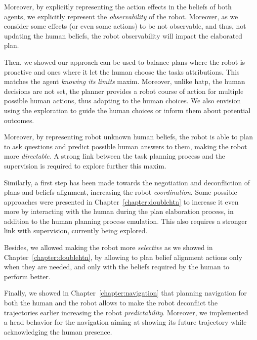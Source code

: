 \documentclass[a4paper,11pt,twoside]{StyleThese}
\begin{document}
Moreover, by explicitly representing the action effects in the beliefs of both agents, we explicitly represent the \textit{observability} of the robot. Moreover, as we consider some effects (or even some actions) to be not observable, and thus, not updating the human beliefs, the robot observability will impact the elaborated plan.

Then, we showed our approach can be used to balance plans where the robot is proactive and ones where it let the human choose the tasks attributions. This matches the agent \textit{knowing its limits} maxim. Moreover, unlike \acrshort{hatp}, the human decisions are not set, the planner provides a robot course of action for multiple possible human actions, thus adapting to the human choices. We also envision using the  exploration to guide the human choices or inform them about potential outcomes.

Moreover, by representing robot unknown human beliefs, the robot is able to plan to ask questions and predict possible human answers to them, making the robot more \textit{directable}. A strong link between the task planning process and the supervision is required to explore further this maxim.

Similarly, a first step has been made towards the negotiation and deconfliction of plans and beliefs alignment, increasing the robot \textit{coordination}. Some possible approaches were presented in Chapter~\ref{chapter:doublehtn} to increase it even more by interacting with the human during the plan elaboration process, in addition to the human planning process emulation. This also requires a stronger link with supervision, currently being explored.

Besides, we allowed making the robot more \textit{selective} as we showed in Chapter~\ref{chapter:doublehtn}, by allowing to plan belief alignment actions only when they are needed, and only with the beliefs required by the human to perform better.

Finally, we showed in Chapter~\ref{chapter:navigation} that planning navigation for both the human and the robot allows to make the robot deconflict the trajectories earlier increasing the robot \textit{predictability}. Moreover, we implemented a head behavior for the navigation aiming at showing its future trajectory while acknowledging the human presence.
\end{document}
